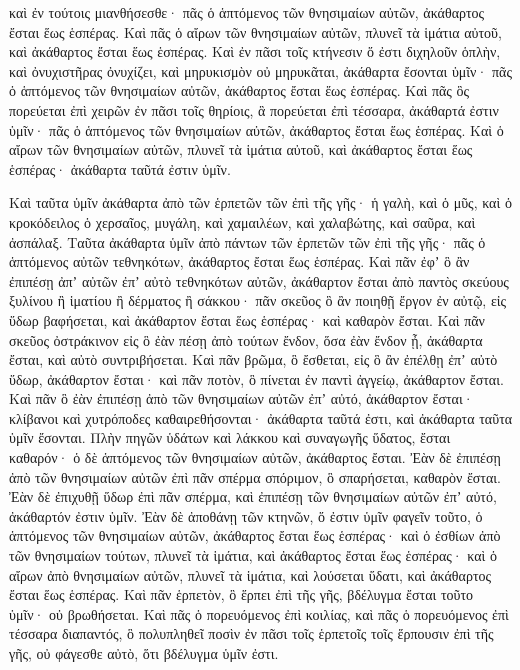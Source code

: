 {καὶ ἐν τούτοις μιανθήσεσθε· πᾶς ὁ ἁπτόμενος τῶν θνησιμαίων αὐτῶν, ἀκάθαρτος ἔσται ἕως ἑσπέρας.
Καὶ πᾶς ὁ αἴρων τῶν θνησιμαίων αὐτῶν, πλυνεῖ τὰ ἱμάτια αὐτοῦ, καὶ ἀκάθαρτος ἔσται ἕως ἑσπέρας.
Καὶ ἐν πᾶσι τοῖς κτήνεσιν ὅ ἐστι διχηλοῦν ὁπλὴν, καὶ ὀνυχιστῆρας ὀνυχίζει, καὶ μηρυκισμὸν οὐ μηρυκᾶται, ἀκάθαρτα ἔσονται ὑμῖν· πᾶς ὁ ἁπτόμενος τῶν θνησιμαίων αὐτῶν, ἀκάθαρτος ἔσται ἕως ἑσπέρας.
Καὶ πᾶς ὃς πορεύεται ἐπὶ χειρῶν ἐν πᾶσι τοῖς θηρίοις, ἃ πορεύεται ἐπὶ τέσσαρα, ἀκάθαρτά ἐστιν ὑμῖν· πᾶς ὁ ἁπτόμενος τῶν θνησιμαίων αὐτῶν, ἀκάθαρτος ἔσται ἕως ἑσπέρας.
Καὶ ὁ αἴρων τῶν θνησιμαίων αὐτῶν, πλυνεῖ τὰ ἱμάτια αὐτοῦ, καὶ ἀκάθαρτος ἔσται ἕως ἑσπέρας· ἀκάθαρτα ταῦτά ἐστιν ὑμῖν.
\par }{\PP {}Καὶ ταῦτα ὑμῖν ἀκάθαρτα ἀπὸ τῶν ἑρπετῶν τῶν ἐπὶ τῆς γῆς· ἡ γαλὴ, καὶ ὁ μῦς, καὶ ὁ κροκόδειλος ὁ χερσαῖος,
μυγάλη, καὶ χαμαιλέων, καὶ χαλαβώτης, καὶ σαῦρα, καὶ ἀσπάλαξ.
Ταῦτα ἀκάθαρτα ὑμῖν ἀπὸ πάντων τῶν ἑρπετῶν τῶν ἐπὶ τῆς γῆς· πᾶς ὁ ἁπτόμενος αὐτῶν τεθνηκότων, ἀκάθαρτος ἔσται ἕως ἑσπέρας.
Καὶ πᾶν ἐφʼ ὃ ἂν ἐπιπέσῃ ἀπʼ αὐτῶν ἐπʼ αὐτὸ τεθνηκότων αὐτῶν, ἀκάθαρτον ἔσται ἀπὸ παντὸς σκεύους ξυλίνου ἢ ἱματίου ἢ δέρματος ἢ σάκκου· πᾶν σκεῦος ὃ ἂν ποιηθῇ ἔργον ἐν αὐτῷ, εἰς ὕδωρ βαφήσεται, καὶ ἀκάθαρτον ἔσται ἕως ἑσπέρας· καὶ καθαρὸν ἔσται.
Καὶ πᾶν σκεῦος ὀστράκινον εἰς ὃ ἐὰν πέσῃ ἀπὸ τούτων ἔνδον, ὅσα ἐὰν ἔνδον ᾖ, ἀκάθαρτα ἔσται, καὶ αὐτὸ συντριβήσεται.
Καὶ πᾶν βρῶμα, ὃ ἔσθεται, εἰς ὃ ἂν ἐπέλθῃ ἐπʼ αὐτὸ ὕδωρ, ἀκάθαρτον ἔσται· καὶ πᾶν ποτὸν, ὃ πίνεται ἐν παντὶ ἀγγείῳ, ἀκάθαρτον ἔσται.
Καὶ πᾶν ὃ ἐὰν ἐπιπέσῃ ἀπὸ τῶν θνησιμαίων αὐτῶν ἐπʼ αὐτό, ἀκάθαρτον ἔσται· κλίβανοι καὶ χυτρόποδες καθαιρεθήσονται· ἀκάθαρτα ταῦτά ἐστι, καὶ ἀκάθαρτα ταῦτα ὑμῖν ἔσονται.
Πλὴν πηγῶν ὑδάτων καὶ λάκκου καὶ συναγωγῆς ὕδατος, ἔσται καθαρόν· ὁ δὲ ἁπτόμενος τῶν θνησιμαίων αὐτῶν, ἀκάθαρτος ἔσται.
Ἐὰν δὲ ἐπιπέσῃ ἀπὸ τῶν θνησιμαίων αὐτῶν ἐπὶ πᾶν σπέρμα σπόριμον, ὃ σπαρήσεται, καθαρὸν ἔσται.
Ἐὰν δὲ ἐπιχυθῇ ὕδωρ ἐπὶ πᾶν σπέρμα, καὶ ἐπιπέσῃ τῶν θνησιμαίων αὐτῶν ἐπʼ αὐτό, ἀκάθαρτόν ἐστιν ὑμῖν.
Ἐὰν δὲ ἀποθάνῃ τῶν κτηνῶν, ὅ ἐστιν ὑμῖν φαγεῖν τοῦτο, ὁ ἁπτόμενος τῶν θνησιμαίων αὐτῶν, ἀκάθαρτος ἔσται ἕως ἑσπέρας·
καὶ ὁ ἐσθίων ἀπὸ τῶν θνησιμαίων τούτων, πλυνεῖ τὰ ἱμάτια, καὶ ἀκάθαρτος ἔσται ἕως ἑσπέρας· καὶ ὁ αἴρων ἀπὸ θνησιμαίων αὐτῶν, πλυνεῖ τὰ ἱμάτια, καὶ λούσεται ὕδατι, καὶ ἀκάθαρτος ἔσται ἕως ἑσπέρας.
Καὶ πᾶν ἑρπετὸν, ὃ ἕρπει ἐπὶ τῆς γῆς, βδέλυγμα ἔσται τοῦτο ὑμῖν· οὐ βρωθήσεται.
Καὶ πᾶς ὁ πορευόμενος ἐπὶ κοιλίας, καὶ πᾶς ὁ πορευόμενος ἐπὶ τέσσαρα διαπαντός, ὃ πολυπληθεῖ ποσὶν ἐν πᾶσι τοῖς ἑρπετοῖς τοῖς ἕρπουσιν ἐπὶ τῆς γῆς, οὐ φάγεσθε αὐτὸ, ὅτι βδέλυγμα ὑμῖν ἐστι.
}
